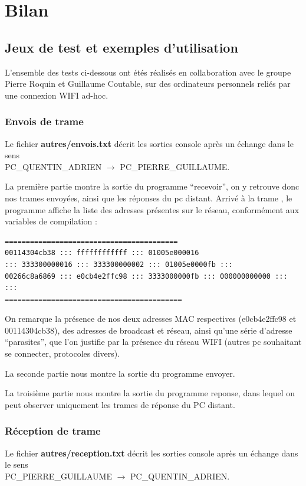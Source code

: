\documentclass[a4paper,11pt]{article}
\begin{document}
	\section{Bilan}
	\subsection{Jeux de test et exemples d'utilisation}
	L'ensemble des tests ci-dessous ont étés réalisés en collaboration avec le groupe Pierre Roquin et Guillaume Coutable, sur des ordinateurs personnels reliés par une connexion WIFI ad-hoc.
	\subsubsection{Envois de trame}
	Le fichier \textbf{autres/envois.txt} décrit les sorties console après un échange dans le sens \\PC\_QUENTIN\_ADRIEN $\to$ PC\_PIERRE\_GUILLAUME.
	
	La première partie montre la sortie du programme ``recevoir'', on y retrouve donc nos trames envoyées, ainsi que les réponses du pc distant.
	Arrivé à la trame , le programme affiche la liste des adresses présentes sur le réseau, conformément aux variables de compilation :
	\begin{lstlisting}
========================================= 
00114304cb38 ::: ffffffffffff ::: 01005e000016 
::: 333300000016 ::: 333300000002 ::: 01005e0000fb ::: 
00266c8a6869 ::: e0cb4e2ffc98 ::: 3333000000fb ::: 000000000000 :::  ::: 
==========================================
	\end{lstlisting}
	On remarque la présence de nos deux adresses MAC respectives (e0cb4e2ffc98 et 00114304cb38), des adresses de broadcast et réseau, ainsi qu'une série d'adresse ``parasites'', que l'on justifie par la présence du réseau WIFI (autres pc souhaitant se connecter, protocoles divers).
	
	La seconde partie nous montre la sortie du programme envoyer.
	
	La troisième partie nous montre la sortie du programme reponse, dans lequel on peut observer uniquement les trames de réponse du PC distant.
	
	\subsubsection{Réception de trame}
	Le fichier \textbf{autres/reception.txt} décrit les sorties console après un échange dans le sens \\PC\_PIERRE\_GUILLAUME $\to$ PC\_QUENTIN\_ADRIEN.
	
\end{document}
